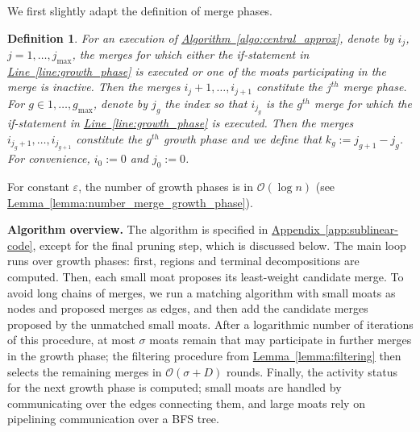\documentclass[letterpaper,11pt]{article}
\newtheorem{definition}[theorem]{Definition}
\newcommand{\namedref}[2]{\hyperref[#2]{#1~\ref*{#2}}}
\newcommand{\lemmaref}[1]{\namedref{Lemma}{#1}}
\newcommand{\appref}[1]{\namedref{Appendix}{#1}}
\newcommand{\algref}[1]{\namedref{Algorithm}{#1}}
\newcommand{\lineref}[1]{\namedref{Line}{#1}}
\newcommand{\BO}{\mathcal{O}}
\renewcommand{\paragraph}[1]{\smallskip\par\noindent\textbf{#1}}
\begin{document}
We first slightly
adapt the definition of merge phases.

\begin{definition}For an execution of \algref{algo:central_approx}, denote by $i_j$,
$j=1,\ldots,j_{\max}$, the merges for which either the if-statement in
\lineref{line:growth_phase} is executed or one of the moats participating in the
merge is inactive. Then the merges $i_j+1,\ldots,i_{j+1}$ constitute the
\emph{$j^{th}$ merge phase}. For $g\in 1,\ldots,g_{\max}$, denote by $j_g$ the
index so that $i_{j_g}$ is the $g^{th}$ merge for which the if-statement in
\lineref{line:growth_phase} is executed. Then the merges
$i_{j_g+1},\ldots,i_{j_{g+1}}$ constitute the \emph{$g^{th}$ growth phase} and
we define that $k_g:=j_{g+1}-j_g$. For convenience, $i_0:=0$ and
$j_0:=0$.
\end{definition}

For constant $\varepsilon$, the number of growth phases is in
$\BO(\log n)$ (see \lemmaref{lemma:number_merge_growth_phase}).


\paragraph{Algorithm overview.}
The algorithm is specified in \appref{app:sublinear-code}, except for the final
pruning step, which is discussed
below. The main loop runs over growth phases:
first, regions and terminal decompositions are computed. Then, each
small moat proposes its least-weight candidate merge. 
To avoid long chains of merges, we run a matching algorithm with
small moats as nodes and proposed merges as edges, and then add the
candidate merges proposed by the unmatched small moats. 
After a
logarithmic number of iterations of this procedure, at most $\sigma$
moats remain that may participate in further merges in the growth
phase; the filtering procedure from \lemmaref{lemma:filtering} then
selects the remaining merges in $\BO(\sigma+D)$ rounds. Finally, the
activity status for the next growth phase is computed;
small moats are handled by communicating over the edges connecting
them, and large moats rely on pipelining communication over a BFS
tree.
\end{document}
